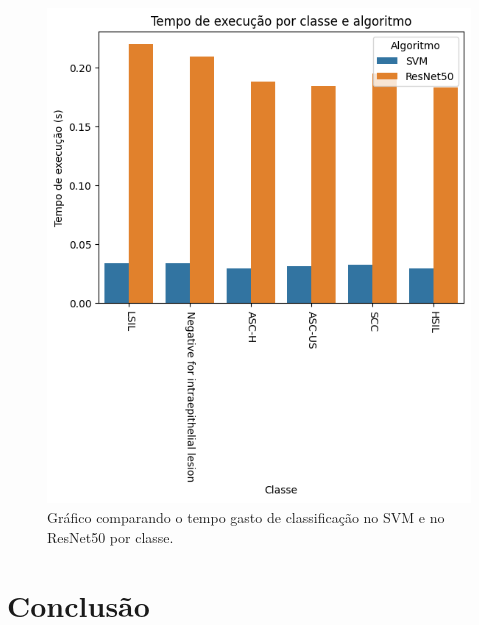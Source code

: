 \documentclass[12pt]{article}
\begin{document}
\begin{figure}[H]
    \centering
    \includegraphics{ResNet50 vs SVM por classe.png}
    \caption{Gráfico comparando o tempo gasto de classificação no SVM e no ResNet50 por classe.}
    \label{fig:grafico-svm-vs-resnet-tempo-por-classe}
\end{figure}

\section{Conclusão}

\nocite{cancerCervical}
\nocite{coloracaoPapanicolau}
\nocite{papanicolauStain}
\nocite{resnet}
\nocite{svm}



\end{document}
